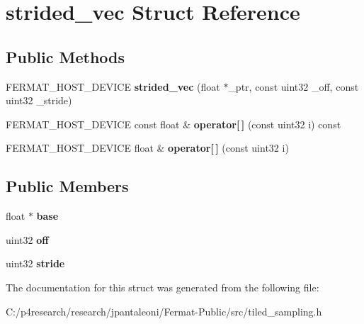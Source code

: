 \hypertarget{structstrided__vec}{}\section{strided\+\_\+vec Struct Reference}
\label{structstrided__vec}
\subsection*{Public Methods}
\begin{DoxyCompactItemize}
\item 
\mbox{\label{structstrided__vec_a8b235604d31810a17c7d69360a0f8e9c}} 
F\+E\+R\+M\+A\+T\+\_\+\+H\+O\+S\+T\+\_\+\+D\+E\+V\+I\+CE {\bfseries strided\+\_\+vec} (float $\ast$\+\_\+ptr, const uint32 \+\_\+off, const uint32 \+\_\+stride)
\item 
\mbox{\label{structstrided__vec_a9db0d0719285f8f567c7497573e57019}} 
F\+E\+R\+M\+A\+T\+\_\+\+H\+O\+S\+T\+\_\+\+D\+E\+V\+I\+CE const float \& {\bfseries operator\mbox{[}$\,$\mbox{]}} (const uint32 i) const
\item 
\mbox{\label{structstrided__vec_a92caada4c1b774768df8933897ba0baf}} 
F\+E\+R\+M\+A\+T\+\_\+\+H\+O\+S\+T\+\_\+\+D\+E\+V\+I\+CE float \& {\bfseries operator\mbox{[}$\,$\mbox{]}} (const uint32 i)
\end{DoxyCompactItemize}
\subsection*{Public Members}
\begin{DoxyCompactItemize}
\item 
\mbox{\label{structstrided__vec_ab38424030cbe03409999a86af6df535d}} 
float $\ast$ {\bfseries base}
\item 
\mbox{\label{structstrided__vec_a9036cacd8aef72b7926725812b4bc001}} 
uint32 {\bfseries off}
\item 
\mbox{\label{structstrided__vec_aeb0817cca46b19afc0a0cf9075370fb2}} 
uint32 {\bfseries stride}
\end{DoxyCompactItemize}


The documentation for this struct was generated from the following file\+:\begin{DoxyCompactItemize}
\item 
C\+:/p4research/research/jpantaleoni/\+Fermat-\/\+Public/src/tiled\+\_\+sampling.\+h\end{DoxyCompactItemize}
